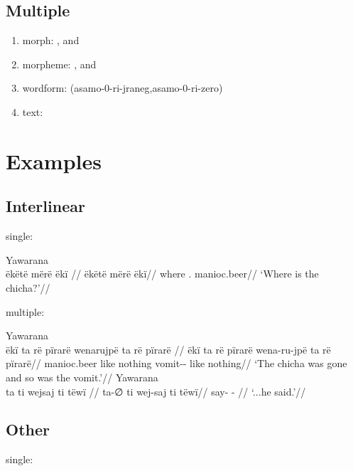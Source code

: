 \documentclass{memoir}
\begin{document}
\subsection{Multiple}

\begin{enumerate}
\def\labelenumi{\arabic{enumi}.}
\tightlist
\item
  morph: , and 
\item
  morpheme: , and 
\item
  wordform: (asamo-0-ri-jraneg,asamo-0-ri-zero)
\item
  text:
\end{enumerate}

\section{Examples}

\subsection{Interlinear}

single:

\ex Yawarana \\
\label{ctorat-34}    \begingl
    \glpreamble  ëkëtë mërë ëkï //
    \gla ëkëtë mërë ëkï//
    \glb where . manioc.beer//
        \glft ‘Where is the chicha?’//  
    \endgl 
\xe

multiple:

\pex\label{multiigt}    \a Yawarana\\
    \label{ctorat-35}        \begingl
        \glpreamble  ëkï ta rë pïrarë wenarujpë ta rë pïrarë //
        \gla ëkï ta rë pïrarë wena-ru-jpë ta rë pïrarë//
        \glb manioc.beer like  nothing vomit-- like  nothing//
            \glft ‘The chicha was gone and so was the vomit.’//  
        \endgl 
    \a Yawarana\\
    \label{ctorat-36}        \begingl
        \glpreamble  ta ti wejsaj ti tëwï //
        \gla ta-∅ ti wej-saj ti tëwï//
        \glb say-  -  //
            \glft ‘...he said.’//  
        \endgl 
\xe

\subsection{Other}

single:
\end{document}
